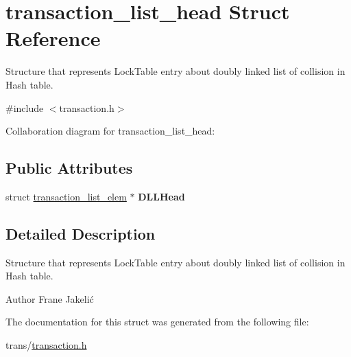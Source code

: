 \hypertarget{structtransaction__list__head}{}\section{transaction\+\_\+list\+\_\+head Struct Reference}
\label{structtransaction__list__head}


Structure that represents Lock\+Table entry about doubly linked list of collision in Hash table.  




{\ttfamily \#include $<$transaction.\+h$>$}



Collaboration diagram for transaction\+\_\+list\+\_\+head\+:
\subsection*{Public Attributes}
\begin{DoxyCompactItemize}
\item 
struct \hyperlink{structtransaction__list__elem}{transaction\+\_\+list\+\_\+elem} $\ast$ {\bfseries D\+L\+L\+Head}\hypertarget{structtransaction__list__head_aa77cdca14266fe533d9ca82bb3d3e8ac}{}\label{structtransaction__list__head_aa77cdca14266fe533d9ca82bb3d3e8ac}

\end{DoxyCompactItemize}


\subsection{Detailed Description}
Structure that represents Lock\+Table entry about doubly linked list of collision in Hash table. 

\begin{DoxyAuthor}{Author}
Frane Jakelić 
\end{DoxyAuthor}


The documentation for this struct was generated from the following file\+:\begin{DoxyCompactItemize}
\item 
trans/\hyperlink{transaction_8h}{transaction.\+h}\end{DoxyCompactItemize}
